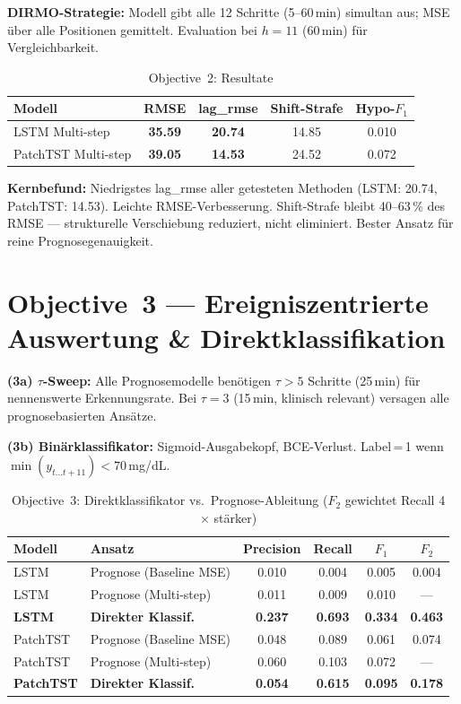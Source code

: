 \documentclass[a4paper,10pt]{article}
\begin{document}
\textbf{DIRMO-Strategie:} Modell gibt alle 12 Schritte (5--60\,min) simultan aus; MSE über alle Positionen gemittelt. Evaluation bei $h{=}11$ (60\,min) für Vergleichbarkeit.

\begin{table}[h!]
\centering
\caption{Objective~2: Resultate}
\begin{tabular}{lcccc}
\toprule
Modell & RMSE & lag\_rmse & Shift-Strafe & Hypo-$F_1$ \\
\midrule
LSTM Multi-step     & \textbf{35.59} & \textbf{20.74} & 14.85 & 0.010 \\
PatchTST Multi-step & \textbf{39.05} & \textbf{14.53} & 24.52 & 0.072 \\
\bottomrule
\end{tabular}
\end{table}

\textbf{Kernbefund:} Niedrigstes lag\_rmse aller getesteten Methoden (LSTM: 20.74, PatchTST: 14.53). Leichte RMSE-Verbesserung. Shift-Strafe bleibt 40--63\,\% des RMSE --- strukturelle Verschiebung reduziert, nicht eliminiert. Bester Ansatz für reine Prognosegenauigkeit.

\section{Objective~3 --- Ereigniszentrierte Auswertung \& Direktklassifikation}

\textbf{(3a) $\tau$-Sweep:} Alle Prognosemodelle benötigen $\tau{>}5$ Schritte (25\,min) für nennenswerte Erkennungsrate. Bei $\tau{=}3$ (15\,min, klinisch relevant) versagen alle prognosebasierten Ansätze.

\textbf{(3b) Binärklassifikator:} Sigmoid-Ausgabekopf, BCE-Verlust. Label\,=\,1 wenn $\min(y_{t\ldots t+11})<70$\,mg/dL.

\begin{table}[h!]
\centering
\caption{Objective~3: Direktklassifikator vs.\ Prognose-Ableitung ($F_2$ gewichtet Recall 4$\times$ stärker)}
\small
\begin{tabular}{llcccc}
\toprule
Modell & Ansatz & Precision & Recall & $F_1$ & $F_2$ \\
\midrule
LSTM & Prognose (Baseline MSE)  & 0.010 & 0.004 & 0.005 & 0.004 \\
LSTM & Prognose (Multi-step)    & 0.011 & 0.009 & 0.010 & --- \\
\textbf{LSTM} & \textbf{Direkter Klassif.} & \textbf{0.237} & \textbf{0.693} & \textbf{0.334} & \textbf{0.463} \\
\midrule
PatchTST & Prognose (Baseline MSE) & 0.048 & 0.089 & 0.061 & 0.074 \\
PatchTST & Prognose (Multi-step)   & 0.060 & 0.103 & 0.072 & --- \\
\textbf{PatchTST} & \textbf{Direkter Klassif.} & \textbf{0.054} & \textbf{0.615} & \textbf{0.095} & \textbf{0.178} \\
\bottomrule
\end{tabular}
\end{table}
\end{document}
